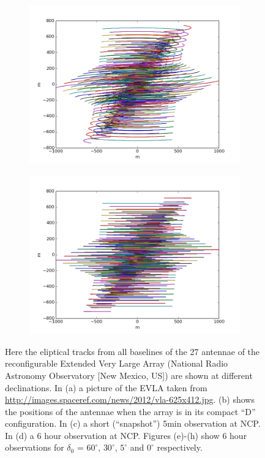 \begin{figure}[h]
\begin{mdframed}
\begin{subfigure}[b]{0.3\textwidth}
  \includegraphics[width=\textwidth]{images/evla_observation/6hr_dec5.png}
  \caption{}
 \end{subfigure}
 \begin{subfigure}[b]{0.3\textwidth}
  \includegraphics[width=\textwidth]{images/evla_observation/6hr_dec0.png}
  \caption{}
 \end{subfigure}
 \caption[u,v coverage]{Here the eliptical tracks from all baselines of the 27 antennae of the reconfigurable 
  Extended Very Large Array (National Radio Astronomy Observatory [New Mexico, US]) are shown at different declinations.
  In (a) a picture of the EVLA taken from \url{http://images.spaceref.com/news/2012/vla-625x412.jpg}. (b) shows the positions of the
  antennae when the array is in its compact ``D'' configuration. In (c) a 
  short (``snapshot'') 5min observation at NCP. In (d) a 6 hour observation at NCP. Figures (e)-(h) show 6 hour 
  observations for $\delta_0$ = $60^{\circ}$, $30^{\circ}$, $5^{\circ}$ and $0^{\circ}$ respectively.}
  \label{fig_evla_observation}
 \end{mdframed}
\end{figure}

